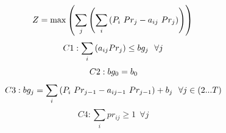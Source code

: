\documentclass[11pt]{article}
\begin{document}
\begin{equation*}
    Z = \max \left( \sum_j \left( \sum_i \left( P_i \ Pr_{j} -  a_{ij} \ Pr_{j} \right) \right) \right) \\
\end{equation*}
\begin{equation*}
    C1: \sum_i  \left( a_{ij} Pr_j \right) \le bg_j \ \ \forall j \\
\end{equation*}
\begin{equation*}
    C2: bg_0 = b_0 \\
\end{equation*}
\begin{equation*}
    C3: bg_j =  \sum_i \left( P_i \ Pr_{j-1} -  a_{ij-1} \ Pr_{j-1} \right) + b_j \ \ \forall j \in (2...T) \\
\end{equation*}
\begin{equation*}
    C4: \sum_i pr_{ij} \ge 1  \ \ \forall j
\end{equation*}

\newpage
\end{document}
